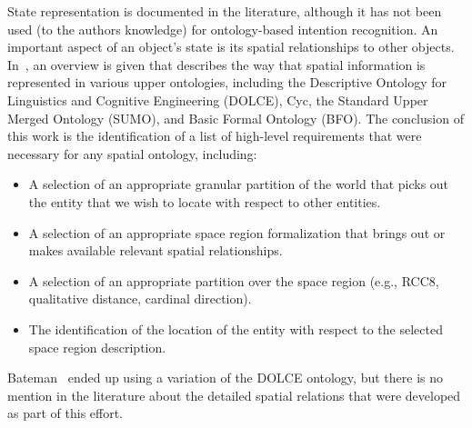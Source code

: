 \documentclass[preprint,12pt]{elsarticle}
\begin{document}
State representation is documented in the literature, although it has not been used (to the authors knowledge) for ontology-based intention recognition. An important aspect of an object's state is its spatial relationships to other objects. In~\cite{Bateman.2006}, an overview is given that describes the way that spatial information is represented in various upper ontologies, including the Descriptive Ontology for Linguistics and Cognitive Engineering (DOLCE), Cyc, the Standard Upper Merged Ontology (SUMO), and Basic Formal Ontology (BFO). The conclusion of this work is the identification of a list of high-level requirements that were necessary for any spatial ontology, including:

\begin{itemize}
\item A selection of an appropriate granular partition of the world that picks out the entity that we wish to locate with respect to other entities.
\item A selection of an appropriate space region formalization that brings out or makes available relevant spatial relationships.
\item A selection of an appropriate partition over the space region (e.g., RCC8, qualitative distance, cardinal direction).
\item The identification of the location of the entity with respect to the selected space region description.
\end{itemize}
Bateman~\cite{Bateman.2006} ended up using a variation of the DOLCE ontology, but there is no mention in the literature about the detailed spatial relations that were developed as part of this effort.
\end{document}
